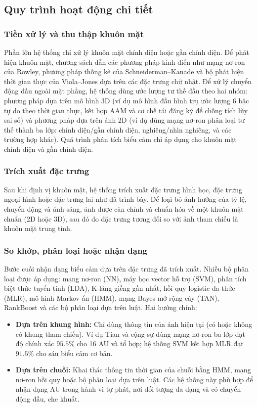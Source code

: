 \subsection{Quy trình hoạt động chi tiết}

\subsubsection{Tiền xử lý và thu thập khuôn mặt}
Phần lớn hệ thống chỉ xử lý khuôn mặt chính diện hoặc gần chính diện. Để phát hiện khuôn mặt, chương sách dẫn các phương pháp kinh điển như mạng nơ-ron của Rowley, phương pháp thống kê của Schneiderman--Kanade và bộ phát hiện thời gian thực của Viola--Jones dựa trên các đặc trưng chữ nhật. Để xử lý chuyển động đầu ngoài mặt phẳng, hệ thống dùng ước lượng tư thế đầu theo hai nhóm: phương pháp dựa trên mô hình 3D (ví dụ mô hình đầu hình trụ ước lượng 6 bậc tự do theo thời gian thực, kết hợp AAM và cơ chế tái đăng ký để chống tích lũy sai số) và phương pháp dựa trên ảnh 2D (ví dụ dùng mạng nơ-ron phân loại tư thế thành ba lớp: chính diện/gần chính diện, nghiêng/nhìn nghiêng, và các trường hợp khác). Quá trình phân tích biểu cảm chỉ áp dụng cho khuôn mặt chính diện và gần chính diện.

\subsubsection{Trích xuất đặc trưng}
Sau khi định vị khuôn mặt, hệ thống trích xuất đặc trưng hình học, đặc trưng ngoại hình hoặc đặc trưng lai như đã trình bày. Để loại bỏ ảnh hưởng của tỷ lệ, chuyển động và ánh sáng, ảnh được căn chỉnh và chuẩn hóa về một khuôn mặt chuẩn (2D hoặc 3D), sau đó đo đặc trưng tương đối so với ảnh tham chiếu là khuôn mặt trung tính.

\subsubsection{So khớp, phân loại hoặc nhận dạng}
Bước cuối nhận dạng biểu cảm dựa trên đặc trưng đã trích xuất. Nhiều bộ phân loại được áp dụng: mạng nơ-ron (NN), máy học vector hỗ trợ (SVM), phân tích biệt thức tuyến tính (LDA), K-láng giềng gần nhất, hồi quy logistic đa thức (MLR), mô hình Markov ẩn (HMM), mạng Bayes mở rộng cây (TAN), RankBoost và các bộ phân loại dựa trên luật. Hai hướng chính:
\begin{itemize}
    \item \textbf{Dựa trên khung hình:} Chỉ dùng thông tin của ảnh hiện tại (có hoặc không có khung tham chiếu). Ví dụ Tian và cộng sự dùng mạng nơ-ron ba lớp đạt độ chính xác $95.5\%$ cho 16 AU và tổ hợp; hệ thống SVM kết hợp MLR đạt $91.5\%$ cho sáu biểu cảm cơ bản.
    \item \textbf{Dựa trên chuỗi:} Khai thác thông tin thời gian của chuỗi bằng HMM, mạng nơ-ron hồi quy hoặc bộ phân loại dựa trên luật. Các hệ thống này phù hợp để nhận dạng AU trong hành vi tự phát, nơi đối tượng đa dạng và có chuyển động đầu, che khuất.
\end{itemize}

